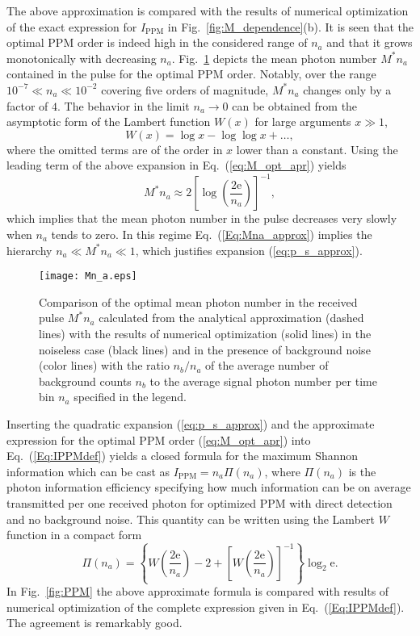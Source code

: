 \documentclass[conference]{IEEEtran}
\newcommand{\optval}[1]{#1^\ast}
\newcommand{\Eul}{\mathrm{e}}
\begin{document}
The above approximation is compared with the results of numerical optimization of the exact expression for $I_{\text{PPM}}$ in Fig.~\ref{fig:M_dependence}(b). It is seen that the optimal PPM order is indeed high in the considered range of $n_a$ and that it grows monotonically with decreasing $n_a$.
Fig.~\ref{fig:Mna} depicts the mean photon number $\optval{M}n_a$ contained in the pulse for the optimal PPM order. Notably, over the range $10^{-7} \ll n_a \ll 10^{-2}$ covering five orders of magnitude, $\optval{M}n_a$ changes only by a factor of $4$.
The behavior in the limit $n_a \rightarrow 0$ can be obtained from the asymptotic form  \cite{Corless1996} of the Lambert function $W(x)$ for large arguments $x \gg 1$,
\begin{equation}\label{eq:lambert}
W(x) = \log x - \log\log x + \ldots,
\end{equation}
where the omitted terms are of the order in $x$ lower than a constant. Using the leading term of the above expansion
in Eq.~(\ref{eq:M_opt_apr}) yields
\begin{equation}
 \optval{M} n_{a} \approx 2\left[ \log \left( \frac{2 \Eul }{ n_{a} } \right) \right] ^{-1} ,
\label{Eq:Mna_approx}
\end{equation}
which implies that the mean photon number in the pulse decreases very slowly when $n_a$ tends to zero. In this regime Eq.~(\ref{Eq:Mna_approx}) implies the  hierarchy $n_a \ll  \optval{M} n_{a} \ll 1$, which justifies expansion (\ref{eq:p_s_approx}).



\begin{figure}
\texttt{[image: Mn\_a.eps]}
\caption{Comparison of the optimal mean photon number in the received pulse $\optval{M}n_a$ calculated from the analytical approximation (dashed lines) with the results of numerical optimization (solid lines) in the noiseless case (black lines) and in the presence of background noise (color lines) with the ratio $n_b/n_a$ of the average number of background counts $n_b$ to the average signal photon number per time bin $n_a$ specified in the legend.}
\label{fig:Mna}
\end{figure}

Inserting  the quadratic expansion (\ref{eq:p_s_approx}) and the approximate expression for the optimal PPM order (\ref{eq:M_opt_apr}) into Eq.~(\ref{Eq:IPPMdef}) yields a closed formula for the maximum Shannon information which can be cast as
$I_{\text{PPM}} = n_{a} \Pi (n_{a})$,
where $\Pi(n_a)$ is the photon information efficiency specifying how much information can be on average transmitted per one received photon for optimized PPM with direct detection and no background noise. This quantity can be written using the Lambert $W$ function in a compact form \cite{Kuszaj}
\begin{equation}
\Pi (n_{a}) =  \left\{ W \left( \frac{2\Eul}{n_{a}} \right) - 2
+ \left[ W \left( \frac{2\Eul}{n_{a}}\right) \right]^{-1} \right\} \log_2 \Eul.
\label{Eq:PIEPPMWW}
\end{equation}
In Fig.~\ref{fig:PPM} the above approximate formula is compared with results of numerical optimization of the complete expression given in Eq.~(\ref{Eq:IPPMdef}). The agreement is remarkably good.
\end{document}
